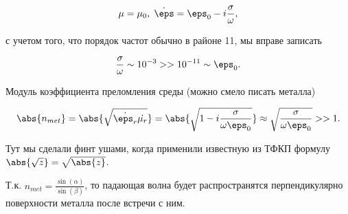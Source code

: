 $$\mu=\mu_0, \; \dot{\eps}=\eps_0-i\frac{\sigma}{\omega}, $$

с учетом того, что порядок частот обычно в районе 11, мы вправе записать

$$\frac{\sigma}{\omega} \sim 10^{-3} >> 10^{-11} \sim \eps_0. $$

Модуль коэффициента преломления среды (можно смело писать металла)

$$\abs{n_{met}}=\abs{\sqrt{\dot{\eps_r}\dot{\mu_r}}}=\abs{\sqrt{1-i\frac{\sigma}{\omega\eps_0}}} \approx 
\sqrt{\frac{\sigma}{\omega\eps_0}} >> 1.$$

Тут мы сделали финт ушами, когда применили известную из ТФКП формулу $\abs{\sqrt{z}}=\sqrt{\abs{z}}$.

Т.к. $n_{met}=\frac{\sin(\alpha)}{\sin(\beta)}$, то падающая волна будет распространятся перпендикулярно
поверхности металла после встречи с ним.
